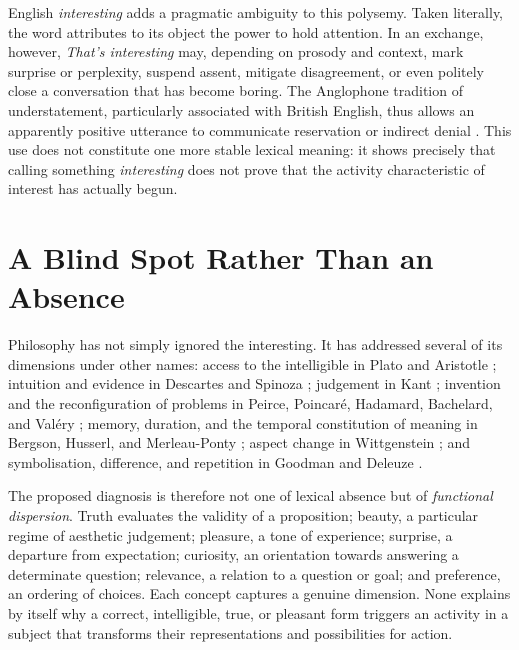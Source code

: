 \documentclass[11pt,a4paper]{article}
\begin{document}
English \emph{interesting} adds a pragmatic ambiguity to this polysemy. Taken
literally, the word attributes to its object the power to hold attention. In an
exchange, however, \emph{That's interesting} may, depending on prosody and
context, mark surprise or perplexity, suspend assent, mitigate disagreement, or
even politely close a conversation that has become boring. The Anglophone
tradition of understatement, particularly associated with British English,
thus allows an apparently positive utterance to communicate reservation or
indirect denial \parencite[29--30]{wierzbicka2006english}. This use does not
constitute one more stable lexical meaning: it shows precisely that calling
something \emph{interesting} does not prove that the activity characteristic of
interest has actually begun.

\section{A Blind Spot Rather Than an Absence}

Philosophy has not simply ignored the interesting. It has addressed several of
its dimensions under other names: access to the intelligible in Plato and
Aristotle
\parencite{platon2016republique,platon1995theetete,aristote1991metaphysique,aristote2005seconds};
intuition and evidence in Descartes and Spinoza
\parencite{descartes2002regles,descartes1992meditations,spinoza1966ethique};
judgement in Kant \parencite{kant2001raison,kant1993juger}; invention and the
reconfiguration of problems in Peirce, Poincaré, Hadamard, Bachelard, and Valéry
\parencite{peirce1955writings,poincare1908science,hadamard1959invention,bachelard1999formation,valery1973cahiers};
memory, duration, and the temporal constitution of meaning in Bergson, Husserl,
and Merleau-Ponty
\parencite{bergson2013evolution,bergson2013pensee,husserl1970experience,husserl1957logique,merleau1945phenomenologie};
aspect change in Wittgenstein \parencite{wittgenstein2004recherches}; and
symbolisation, difference, and repetition in Goodman and Deleuze
\parencite{goodman1976languages,deleuze1968difference}.

The proposed diagnosis is therefore not one of lexical absence but of
\emph{functional dispersion}. Truth evaluates the validity of a proposition;
beauty, a particular regime of aesthetic judgement; pleasure, a tone of
experience; surprise, a departure from expectation; curiosity, an orientation
towards answering a determinate question; relevance, a relation to a question or goal; and
preference, an ordering of choices. Each concept captures a genuine dimension.
None explains by itself why a correct, intelligible, true, or pleasant form
triggers an activity in a subject that transforms their representations and
possibilities for action.
\end{document}
